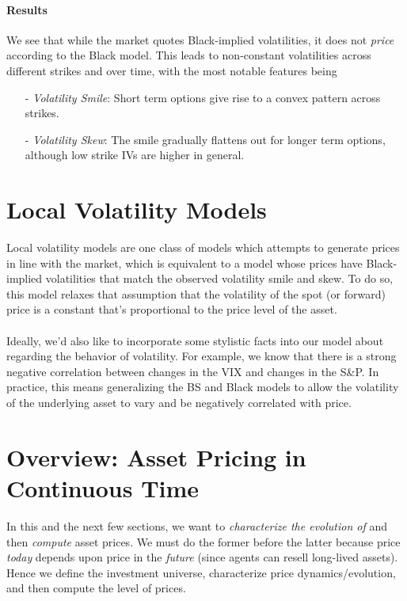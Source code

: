 \documentclass[12pt]{article}
\theoremstyle{plain}
\theoremstyle{definition}
\theoremstyle{remark}
\begin{document}
\paragraph{Results} We see that while the market quotes Black-implied
volatilities, it does not \emph{price} according to the Black model.
This leads to non-constant volatilities across different strikes
and over time, with the most notable features being
\begin{itemize}
   \item[-] {\sl Volatility Smile}: Short term options give rise to
      a convex pattern across strikes.
   \item[-] {\sl Volatility Skew}: The smile gradually flattens
      out for longer term options, although low strike IVs are
      higher in general.
\end{itemize}

\newpage
\section{Local Volatility Models}

Local volatility models are one class of models which attempts to 
generate prices in line with
the market, which is equivalent to a model
whose prices have Black-implied volatilities that match the observed
volatility smile and skew.  To do so, this model relaxes that 
assumption that the volatility of the spot (or forward) price
is a constant that's proportional to the price level of the asset.
\\
\\
Ideally, we'd also like to incorporate some stylistic facts into
our model about regarding the behavior of volatility. For example,
we know that there is a strong negative correlation between
changes in the VIX and changes in the S\&P.  In practice, this means
generalizing the BS and Black models to allow the volatility
of the underlying asset to vary and be negatively correlated with price.




\clearpage
\section{Overview: Asset Pricing in Continuous Time}

In this and the next few sections, we want to
\emph{characterize the evolution of} and then \emph{compute} asset
prices.
We must do the former before the latter because price \emph{today}
depends upon price in the \emph{future} (since agents can resell
long-lived assets).
Hence we define the investment universe, characterize price
dynamics/evolution, and then compute the level of prices.
\end{document}
